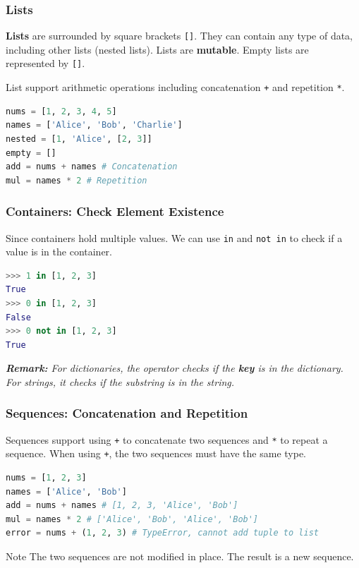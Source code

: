 \documentclass[beamer, en, version=2.0]{huangfusl-template}
\begin{document}
    \begin{frame}[fragile]
        \frametitle{Lists}

        \textbf{Lists} are surrounded by square brackets {\footnotesize\verb|[]|}. They can contain any type of data, including other lists (nested lists). Lists are \textbf{mutable}. Empty lists are represented by {\footnotesize\verb|[]|}.

        List support arithmetic operations including concatenation {\footnotesize\verb|+|} and repetition {\footnotesize\verb|*|}.

\begin{lstlisting}[language=python]
nums = [1, 2, 3, 4, 5]
names = ['Alice', 'Bob', 'Charlie']
nested = [1, 'Alice', [2, 3]]
empty = []
add = nums + names # Concatenation
mul = names * 2 # Repetition
\end{lstlisting}
    \end{frame}
    \begin{frame}[fragile]
        \frametitle{Containers: Check Element Existence}

        Since containers hold multiple values. We can use {\footnotesize\verb|in|} and {\footnotesize\verb|not in|} to check if a value is in the container.

\begin{lstlisting}[language=python]
>>> 1 in [1, 2, 3]
True
>>> 0 in [1, 2, 3]
False
>>> 0 not in [1, 2, 3]
True
\end{lstlisting}


        {\footnotesize\itshape\textbf{Remark:} For dictionaries, the operator checks if the \textbf{key} is in the dictionary. For strings, it checks if the substring is in the string.}

    \end{frame}
    \begin{frame}[fragile]
        \frametitle{Sequences: Concatenation and Repetition}

        Sequences support using {\footnotesize\verb|+|} to concatenate two sequences and {\footnotesize\verb|*|} to repeat a sequence. When using {\footnotesize\verb|+|}, the two sequences must have the same type.

\begin{lstlisting}[language=python]
nums = [1, 2, 3]
names = ['Alice', 'Bob']
add = nums + names # [1, 2, 3, 'Alice', 'Bob']
mul = names * 2 # ['Alice', 'Bob', 'Alice', 'Bob']
error = nums + (1, 2, 3) # TypeError, cannot add tuple to list
\end{lstlisting}

        \begin{block}{Note}
            The two sequences are not modified in place. The result is a new sequence.
        \end{block}
    \end{frame}
\end{document}
